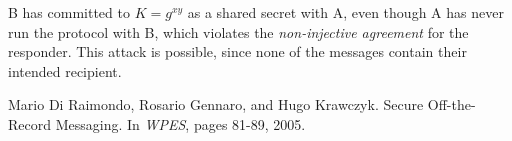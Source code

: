 \documentclass[a4paper]{article}
\begin{document}
B has committed to ${K=g^{xy}}$ as a shared secret with A, even though A has never run the protocol with B, which violates the {\em non-injective agreement} for the responder. This attack is possible, since none of the messages contain their intended recipient.

\begin{thebibliography}{999}
 Mario Di Raimondo, Rosario Gennaro, and Hugo Krawczyk. Secure Off-the-Record Messaging. In {\em WPES}, pages 81-89, 2005.
\end{thebibliography}
\end{document}
